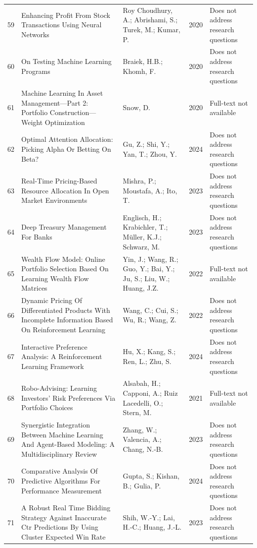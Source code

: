 \begin{small}
\begin{longtable}{r p{5cm} p{4cm} p{1cm} p{5cm}}
59 & Enhancing Profit From Stock Transactions Using Neural Networks & Roy Choudhury, A.; Abrishami, S.; Turek, M.; Kumar, P. & 2020 & Does not address research questions \\
60 & On Testing Machine Learning Programs & Braiek, H.B.; Khomh, F. & 2020 & Does not address research questions \\
61 & Machine Learning In Asset Management—Part 2: Portfolio Construction— Weight Optimization & Snow, D. & 2020 & Full-text not available \\
62 & Optimal Attention Allocation: Picking Alpha Or Betting On Beta? & Gu, Z.; Shi, Y.; Yan, T.; Zhou, Y. & 2024 & Does not address research questions \\
63 & Real-Time Pricing-Based Resource Allocation In Open Market Environments & Mishra, P.; Moustafa, A.; Ito, T. & 2023 & Does not address research questions \\
64 & Deep Treasury Management For Banks & Englisch, H.; Krabichler, T.; Müller, K.J.; Schwarz, M. & 2023 & Does not address research questions \\
65 & Wealth Flow Model: Online Portfolio Selection Based On Learning Wealth Flow Matrices & Yin, J.; Wang, R.; Guo, Y.; Bai, Y.; Ju, S.; Liu, W.; Huang, J.Z. & 2022 & Full-text not available \\
66 & Dynamic Pricing Of Differentiated Products With Incomplete Information Based On Reinforcement Learning & Wang, C.; Cui, S.; Wu, R.; Wang, Z. & 2022 & Does not address research questions \\
67 & Interactive Preference Analysis: A Reinforcement Learning Framework & Hu, X.; Kang, S.; Ren, L.; Zhu, S. & 2024 & Does not address research questions \\
68 & Robo-Advising: Learning Investors' Risk Preferences Via Portfolio Choices & Alsabah, H.; Capponi, A.; Ruiz Lacedelli, O.; Stern, M. & 2021 & Full-text not available \\
69 & Synergistic Integration Between Machine Learning And Agent-Based Modeling: A Multidisciplinary Review & Zhang, W.; Valencia, A.; Chang, N.-B. & 2023 & Does not address research questions \\
70 & Comparative Analysis Of Predictive Algorithms For Performance Measurement & Gupta, S.; Kishan, B.; Gulia, P. & 2024 & Does not address research questions \\
71 & A Robust Real Time Bidding Strategy Against Inaccurate Ctr Predictions By Using Cluster Expected Win Rate & Shih, W.-Y.; Lai, H.-C.; Huang, J.-L. & 2023 & Does not address research questions \\

\end{longtable}
\end{small}
